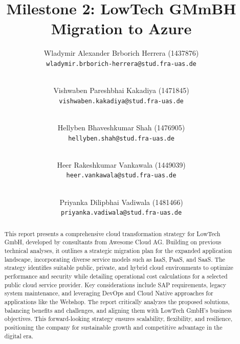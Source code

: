 \documentclass{llncs}
\newcommand{\what}{Milestone 2: LowTech GMmBH Migration to Azure}
\begin{document}
%
%
%
\mainmatter              %
%
\title{\what}
%
\author{
 Wladymir Alexander Brborich Herrera (1437876)\\
    \texttt{wladymir.brborich-herrera@stud.fra-uas.de}
    \and\\
 Vishwaben Pareshbhai Kakadiya (1471845)\\
    \texttt{vishwaben.kakadiya@stud.fra-uas.de}
    \and\\
 Hellyben Bhaveshkumar Shah (1476905)\\
    \texttt{hellyben.shah@stud.fra-uas.de}
    \and\\
 Heer Rakeshkumar Vankawala (1449039)
    \\
    \texttt{heer.vankawala@stud.fra-uas.de}
    \and\\
 Priyanka Dilipbhai Vadiwala (1481466)\\
    \texttt{priyanka.vadiwala@stud.fra-uas.de}
}
%

\maketitle              %

\begin{abstract}
 This report presents a comprehensive cloud transformation strategy for LowTech GmbH, developed by consultants from Awesome Cloud AG.
 Building on previous technical analyses, it outlines a strategic migration plan for the expanded application landscape,
 incorporating diverse service models such as IaaS, PaaS, and SaaS. The strategy identifies suitable public, private,
 and hybrid cloud environments to optimize performance and security while detailing operational cost calculations
 for a selected public cloud service provider. Key considerations include SAP requirements, legacy system maintenance,
 and leveraging DevOps and Cloud Native approaches for applications like the Webshop.
 The report critically analyzes the proposed solutions, balancing benefits and challenges,
 and aligning them with LowTech GmbH’s business objectives. This forward-looking strategy ensures scalability, flexibility, and resilience, positioning
 the company for sustainable growth and competitive advantage in the digital era.

\end{abstract}
\end{document}
